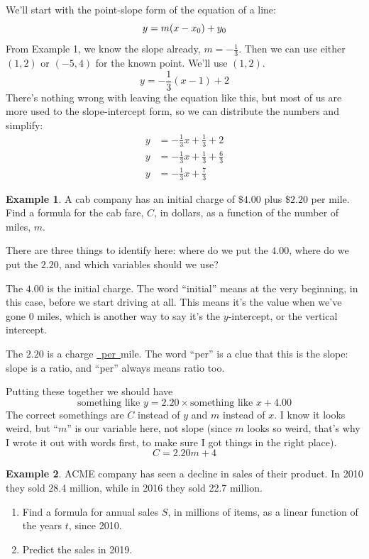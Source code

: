 \documentclass[oneside]{book}
\theoremstyle{definition}
\newtheorem{example}{Example}
\theoremstyle{solution}
\newtheorem*{solution}{Solution}
\newenvironment{solution}{\vspace{2in}\comment}{\endcomment}
\begin{document}
\begin{solution}
  We'll start with the point-slope form of the equation of a line:
   $$
   y  = m(x-x_0) + y_0\\
  $$
  From Example 1, we know the slope already, $m = -\frac{1}{3}$.  Then
  we can use either $(1,2)$ or $(-5,4)$ for the known point.  We'll
  use $(1,2)$.
$$
          y = -\frac{1}{3}(x-1) +2
$$
There's nothing wrong with leaving the equation like this, but most of
us are more used to the slope-intercept form, so we can distribute the
numbers and simplify:
  \begin{align*}
    y & = -\frac{1}{3}x + \frac{1}{3} + 2 \\
    y  & = -\frac{1}{3}x + \frac{1}{3} + \frac{6}{3}\\
    y  & = -\frac{1}{3}x + \frac{7}{3}
  \end{align*}
\end{solution}

\begin{example}
  A cab company has an initial charge of $\$4.00$ plus $\$2.20$ per
  mile.  Find a formula for the cab fare, $C$, in dollars, as a
  function of the number of miles, $m$.
\end{example}


\begin{solution}
  There are three things to identify here: where do we put the $4.00$,
  where do we put the $2.20$, and which variables should we use?

  The $4.00$ is the initial charge.  The word ``initial'' means at the
  very beginning, in this case, before we start driving at all.  This
  means it's the value when we've gone $0$ miles, which is another way
  to say it's the $y$-intercept, or the vertical intercept.

  The $2.20$ is a charge \underline{\ per\ }mile.  The word ``per'' is a
  clue that this is the slope: slope is a ratio, and ``per'' always
  means ratio too.

  Putting these together we should have
$$
\text{something like }y = 2.20\times \text{something like }x + 4.00
$$
The correct somethings are $C$ instead of $y$ and $m$ instead of $x$.
I know it looks weird, but ``$m$'' is our variable here, not slope
(since $m$ looks so weird, that's why I wrote it out with words first,
to make sure I got things in the right place).
  $$ 
  C = 2.20m + 4
  $$
\end{solution}


\begin{example}
  ACME company has seen a decline in sales of their product. In 2010
  they sold 28.4 million, while in 2016 they sold 22.7 million.
  \begin{enumerate}
  \item Find a formula for annual sales $S$, in millions of items, as
    a linear function of the years $t$, since 2010.
  \item Predict the sales in 2019.
  \end{enumerate}
\end{example}
\end{document}
